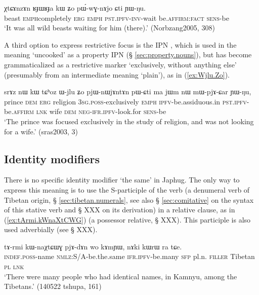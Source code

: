 \begin{exe}
\ex \label{ex:RJWRJa.kW}
 \gll χtɕɤnzɤn ʁɟɯ\redp{}ʁɟa kɯ ʑo pɯ́-wɣ-nɤjo ɕti ɲɯ-ŋu.  \\
beast \textsc{emph}\redp{}completely \textsc{erg} \textsc{emph} \textsc{pst}.\textsc{ipfv}-\textsc{inv}-wait be.\textsc{affirm}:\textsc{fact} \textsc{sens}-be \\
\glt `It was all wild beasts waiting for him (there).' (Norbzang2005, 308)
 \end{exe}
 
A third option to express restrictive focus is the IPN , which is used in the meaning `uncooked' as a property IPN (§ \ref{sec:property.nouns}), but has become grammaticalized as a restrictive marker `exclusively, without anything else' (presumably from an intermediate meaning `plain'), as in (\ref{ex:Wjlu.Zo}).

\begin{exe}
\ex \label{ex:Wjlu.Zo}
 \gll srɤz nɯ kɯ tɕʰoz ɯ-jlu ʑo pjɯ-nɯjɤntɤn pɯ-ɕti ma jɯm nɯ mɯ-pjɤ-ɕar ɲɯ-ŋu, \\
prince \textsc{dem} \textsc{erg}  religion \textsc{3sg}.\textsc{poss}-exclusively \textsc{emph} \textsc{ipfv}-be.assiduous.in  \textsc{pst}.\textsc{ipfv}-be.\textsc{affirm} \textsc{lnk} wife \textsc{dem} \textsc{neg}-\textsc{ifr}.\textsc{ipfv}-look.for \textsc{sens}-be \\
 \glt `The prince was focused exclusively in the study of religion, and was not looking for a wife.' (sras2003, 3)
 \end{exe}

\subsection{Identity modifiers} \label{sec:identity.modifier}
There is no specific identity modifier `the same' in Japhug. The only way to express this meaning is to use the S-participle of the verb  (a denumeral verb of Tibetan origin, § \ref{sec:tibetan.numerals}, see also § \ref{sec:comitative} on the syntax of this stative verb and § XXX on its derivation) in a relative clause, as in (\ref{ex:tArmi.kWnaXtCWG}) (a possessor relative, § XXX). This participle is also used adverbially (see § XXX).

\begin{exe}
\ex \label{ex:tArmi.kWnaXtCWG}
\gll tɤ-rmi kɯ-naχtɕɯɣ pjɤ-dɤn wo kɤmɲɯ, nɤki kɯrɯ ra tɕe. \\
\textsc{indef}.\textsc{poss}-name \textsc{nmlz}:S/A-be.the.same \textsc{ifr}.\textsc{ipfv}-be.many \textsc{sfp} pl.n. \textsc{filler} Tibetan \textsc{pl} \textsc{lnk} \\
\glt `There were many people who had identical names, in Kamnyu, among the Tibetans.' (140522 tshupa, 161)
\end{exe}


